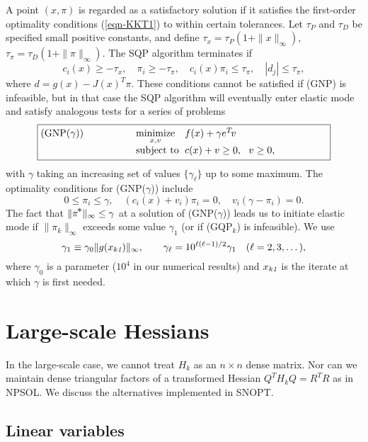 \documentclass[draft,leqno,onefignum,onetabnum]{siamltex}
\makeatletter
\def\D{_{\scriptscriptstyle D}}
\def\minim{\mathop{\hbox{\rm minimize}}}
\def\minimize#1{{\displaystyle\minim_{#1}}}
\def\norm#1{\|#1\|}
\def\nthinsp{\mskip -2   mu}
\def\pistar{\pi\superstar}
\def\P{_{\scriptscriptstyle P}}
\def\subject{\mbox{\rm subject to}}
\def\superstar{^{\raise 0.5pt\hbox{$\nthinsp *$}}}
\def\Seq#1{\{ #1 \}}
\def\T{^T\!}
\def\kb#1{k\mskip -0.90 mu\mbox{\scriptsize\it#1}}
\def\GQPk{GQP$_k$}
\def\NPSOL {{\small NPSOL}}
\def\SNOPT {{\small SNOPT}}
\def\problem#1#2#3#4{\fbox
   {\begin{tabular*}{0.84\textwidth}
    {@{}l@{\extracolsep{\fill}}l@{\extracolsep{6pt}}l@{\extracolsep{\fill}}c@{}}
      #1 & $\minimize{#2}$ & $#3$ & $ $ \\[5pt]
         & $\subject$      & $#4$ & $ $
    \end{tabular*}}}
\newcommand{\infnorm}[1]{\norm{#1}_{\infty}}
\makeatother
\begin{document}
A point $(x,\pi)$ is regarded as a satisfactory solution
if it satisfies the first-order optimality conditions (\ref{eqn-KKT1})
to within certain tolerances.
Let $\tau\P$ and $\tau\D$ be specified small positive constants,
and define $\tau_x = \tau\P(1 + \infnorm{x})$,
$\tau_{\pi} = \tau\D(1 + \infnorm{\pi})$.  The SQP algorithm terminates if
\begin{equation}                                \label{eqn-conv}
         c_i(x) \ge -\tau_x,     \quad
          \pi_i \ge -\tau_{\pi}, \quad
   c_i(x) \pi_i \le  \tau_{\pi}, \quad
          |d_j| \le  \tau_{\pi},
\end{equation}
where $d = g(x) - J(x)\T\pi$.
These conditions cannot be satisfied if (GNP) is infeasible,
but in that case the SQP algorithm will eventually enter
elastic mode and satisfy analogous tests for a series of problems
$$
   \problem{(GNP($\gamma$))}{x,v}{f(x) + \gamma e\T v}
                               {c(x) + v \ge 0,\ \ v \ge 0,}
$$
with $\gamma$ taking an increasing set of values $\Seq{\gamma_{\ell}}$
up to some maximum.
The optimality conditions for (GNP($\gamma$)) include
$$
           0  \le  \pi_i  \le \gamma,  \quad
        (c_i(x) + v_i)\pi_i = 0,       \quad
        v_i(\gamma - \pi_i) = 0.
$$
The fact that $\infnorm{\pistar} \le \gamma$ at a solution of (GNP($\gamma$))
leads us to initiate elastic mode if $\infnorm{\pi_k}$ exceeds
some value $\gamma_1$ (or if (\GQPk) is infeasible).
We use
\begin{equation}                                \label{eqn-gamma}
   \gamma_{1} \equiv \gamma_0 \infnorm{g(x_{\kb1})}, \qquad
   \gamma_{\ell} = 10^{\ell(\ell-1)/2} \gamma_1 \quad (\ell = 2, 3, \ldots\,),
\end{equation}
where $\gamma_0$ is a parameter ($10^4$ in our numerical results)
and $x_{\kb1}$ is the iterate at which $\gamma$ is first needed.



 \section{Large-scale Hessians}  \label{sec-Hessian}

In the large-scale case, we cannot treat $H_k$ as an $n \times n$
dense matrix.  Nor can we maintain dense triangular factors of a
transformed Hessian $Q\T H_k Q = R\T R$ as in \NPSOL\@.  We discuss the
alternatives implemented in \SNOPT{}\@.

 \subsection{Linear variables}  \label{sec-lin-vars}
\end{document}
